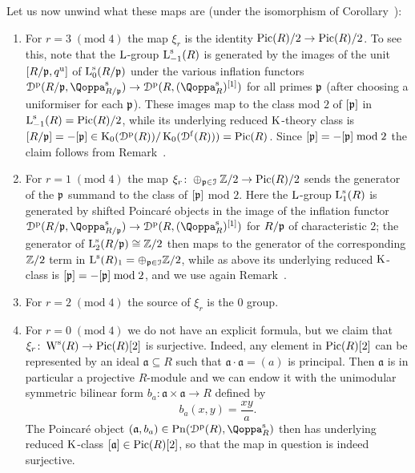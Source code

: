 \begin{example}
Let us now unwind what these maps are (under the isomorphism of Corollary~):
\begin{enumerate}
\item
For $r = 3\;(\mathrm{mod}\;4)$ the map $\xi_r$ is the identity $\operatorname{Pic}(R)/2 \to \operatorname{Pic}(R)/2$. To see this, note that the $\operatorname L$-group $\operatorname L^{\mathrm{s}}_{-1}(R)$ is generated by the images of the unit $[R/\mathfrak{p},q^{\mathrm{u}}]$ of $\operatorname L^{\mathrm{s}}_{0}(R/\mathfrak{p})$ under the various inflation functors $\Dperf(R/\fp,\QF^{\sym}_{R/\fp}) \to \Dperf(R,(\QF^{\sym}_R)\qshift{1})$ for all primes $\mathfrak{p}$ (after choosing a uniformiser for each $\mathfrak{p}$). 
These images map
to the class mod $2$ of $[\mathfrak{p}]$ in $\operatorname L^{\mathrm{s}}_{-1}(R) = \operatorname{Pic}(R)/2$, while its underlying reduced $\operatorname K$-theory class is $[R/\mathfrak{p}] = -[\mathfrak{p}] \in \operatorname K_0({\mathcal D}^{\mathrm{p}}(R))/\operatorname K_0({\mathcal D}^{\mathrm{f}}(R))) = \operatorname{Pic}(R)$. Since $[\mathfrak{p}]=-[\mathfrak{p}] \;\mathrm{mod}\;2$ the claim follows from Remark~.
\item
For $r = 1\;(\mathrm{mod}\;4)$ the map $\xi_r\colon \oplus_{\mathfrak{p} \in \mathcal{I}}\mathbb{Z}/2 \to \operatorname{Pic}(R)/2$ sends the generator of the $\mathfrak{p}$ summand to the class of $[\mathfrak{p}]$ mod $2$.
Here the $\operatorname L$-group $\operatorname L_1^{\mathrm{s}}(R)$ is generated by shifted Poincaré objects in the image of the inflation functor $\Dperf(R/\fp,\QF^{\sym}_{R/\fp}) \to \Dperf(R,(\QF^{\sym}_R)\qshift{1})$ for $R/\mathfrak{p}$ of characteristic $2$; the generator of $\operatorname L^{\mathrm{s}}_{2}(R/\mathfrak{p}) \cong \mathbb{Z}/2$ then maps to the generator of the corresponding $\mathbb{Z}/2$ term in $\operatorname L^{\mathrm{s}}(R)_{1} = \oplus_{\mathfrak{p} \in \mathcal{I}}\mathbb{Z}/2$, while as above its underlying reduced $\operatorname K$-class is $[\mathfrak{p}]=-[\mathfrak{p}] \;\mathrm{mod}\;2$, and we use again Remark~.
\item
For $r = 2\;(\mathrm{mod}\;4)$ the source of $\xi_r$ is the 0 group.
\item
For $r = 0\;(\mathrm{mod}\;4)$ we do not have an explicit formula, but we claim that $\xi_r\colon \operatorname W^{\mathrm{s}}(R) \to \operatorname{Pic}(R)[2]$ is surjective. Indeed, any element in $\operatorname{Pic}(R)[2]$ can be represented by an ideal $\mathfrak{a} \subseteq R$ such that $\mathfrak{a}\cdot \mathfrak{a} = (a)$ is principal. Then $\mathfrak{a}$ is in particular a projective $R$-module and we can endow it with the unimodular symmetric bilinear form $b_a\colon \mathfrak{a} \times \mathfrak{a} \to R$ defined by
\[
b_a(x,y) = \frac{xy}{a} .
\]
The Poincaré object $(\mathfrak{a},b_a) \in \Poinc(\Dperf(R),\QF^{\sym}_R)$ then has underlying reduced $\operatorname K$-class $[\mathfrak{a}] \in \operatorname{Pic}(R)[2]$, so that the map in question is indeed surjective. 
\end{enumerate}



\end{example}
